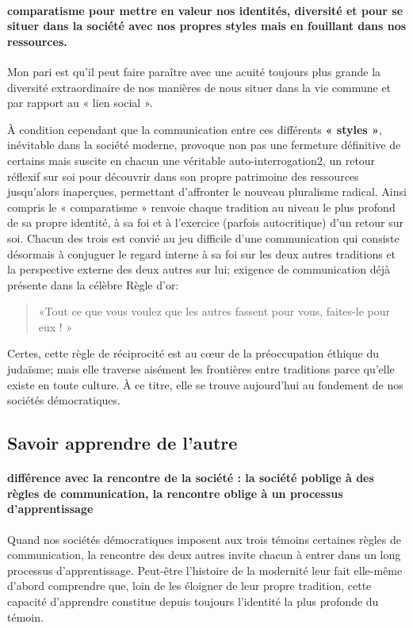 \paragraph{comparatisme pour mettre en valeur nos identités, diversité et pour se situer dans la société avec nos propres styles mais en fouillant dans nos ressources. }
\begin{Synthesis}
Mon pari est qu'il peut faire paraître avec une acuité toujours plus grande la diversité extraordinaire de nos manières de nous situer dans la vie commune et par rapport au « lien social ».     
\end{Synthesis}
À condition cependant que la communication entre ces différents \textbf{« styles »}, inévitable dans la société moderne, provoque non pas une fermeture définitive de certains mais suscite en chacun une véritable auto-interrogation2, un retour  réflexif sur soi pour découvrir dans son propre patrimoine des ressources jusqu'alors inaperçues, permettant d'affronter le nouveau pluralisme radical.
Ainsi compris le « comparatisme » renvoie chaque tradition au niveau le plus profond de sa propre identité, à sa foi et à l'exercice (parfois autocritique) d'un retour sur soi. Chacun des trois est convié au jeu difficile d'une communication qui consiste désormais à conjuguer le regard interne à sa foi sur les deux autres traditions et la perspective externe des deux autres sur lui; exigence de communication déjà présente dans la célèbre Règle d'or: \begin{quote}
    «Tout ce que vous voulez que les autres fassent pour vous, faites-le pour eux ! » 
\end{quote}Certes, cette règle de réciprocité est au cœur de la préoccupation éthique du judaïsme; mais elle traverse aisément les frontières entre traditions parce qu'elle existe en toute culture. À ce titre, elle se trouve aujourd'hui au fondement de nos sociétés démocratiques.

\subsection{Savoir apprendre de l'autre}

\paragraph{différence avec la rencontre de la société : la société poblige à des règles de communication, la rencontre oblige à un processus d'apprentissage}
Quand nos sociétés démocratiques imposent aux trois témoins certaines règles de communication, la rencontre des deux autres invite chacun à entrer dans un long processus d'apprentissage. Peut-être l'histoire de la modernité leur fait elle-même d'abord comprendre que, loin de les éloigner de leur propre tradition, cette capacité d'apprendre constitue depuis toujours l'identité la plus profonde du témoin.

